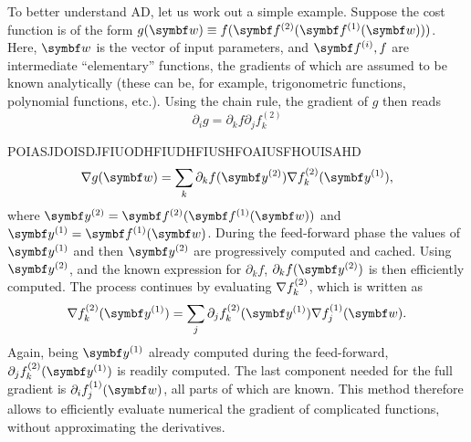 To better understand \ac{AD}, let us work out a simple example.
Suppose the cost function is of the form
$g(\bs w)\equiv f(\bs f^{(2)}(\bs f^{(1)}(\bs w)))$.
Here, $\bs w$ is the vector of input parameters, and $\bs f^{(i)},f$ are intermediate ``elementary'' functions, the gradients of which are assumed to be known analytically (these can be, for example, trigonometric functions, polynomial functions, etc.).
Using the chain rule, the gradient of $g$ then reads
\begin{equation}
    \partial_i g = \partial_k f \partial_j f^{(2)}_k
\end{equation}

POIASJDOISDJFIUODHFIUDHFIUSHFOAIUSFHOUISAHD
\begin{equation}
\begin{split}
	\grad g(\bs w) =
	\sum_{k} \partial_{k} f(\bs y^{(2)})
	\grad f_{k}^{(2)}(\bs y^{(1)}),
\end{split}
\label{eq:GL:grad_nested_f}
\end{equation}
where $\bs y^{(2)} = \bs f^{(2)}(\bs f^{(1)}(\bs w))$ and
$\bs y^{(1)} = \bs f^{(1)}(\bs w)$.
During the feed-forward phase the values of $\bs y^{(1)}$ and then $\bs y^{(2)}$ are progressively computed and cached.
Using $\bs y^{(2)}$, and the known expression for $\partial_k f$, $\partial_{k} f(\bs y^{(2)})$ is then efficiently computed.
The process continues by evaluating $\nabla f_k^{(2)}$, which is written as
\begin{equation}
	\grad f_k^{(2)}(\bs y^{(1)}) =
	\sum_j \partial_j f_k^{(2)}(\bs y^{(1)}) \grad f_j^{(1)}(\bs w).
\end{equation}
Again, being $\bs y^{(1)}$ already computed during the feed-forward, $\partial_j f_k^{(2)}(\bs y^{(1)})$ is readily computed.
The last component needed for the full gradient is $\partial_i f_j^{(1)}(\bs w)$, all parts of which are known.
This method therefore allows to efficiently evaluate numerical the gradient of complicated functions, without approximating the derivatives.

